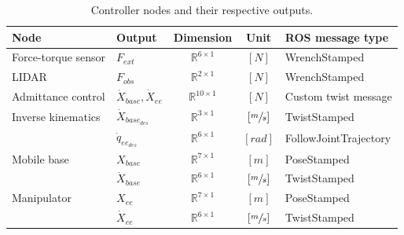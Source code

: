 \begin{table}[h]
\begin{center}
 \caption{Controller nodes and their respective outputs.}\vspace{1ex}
 \label{tab:controller_nodes}
 \begin{tabular}{l|lccl}
 \hline
Node & Output & Dimension & Unit & ROS message type \\ \hline \hline
Force-torque sensor & $F_{ext}$ & $\mathbb{R}^{6 \times 1}$ & $[N]$ & WrenchStamped \\
LIDAR & $F_{obs}$ & $\mathbb{R}^{2 \times 1}$ & $[N]$ & WrenchStamped \\
Admittance control & $\dot{X}_{base},\dot{X}_{ee}$ & $\mathbb{R}^{10 \times 1}$ & $[N]$ & Custom twist message \\
Inverse kinematics & $\dot{X}_{base_{des}}$ & $\mathbb{R}^{3 \times 1}$  & $[\sfrac{m}{s}]$ & TwistStamped \\
& $\dot{q}_{ee_{des}}$&$\mathbb{R}^{6 \times 1}$ & $[rad]$ & FollowJointTrajectory\\
Mobile base & $X_{base}$ & $\mathbb{R}^{7 \times 1}$ & $[m]$ & PoseStamped \\
& $\dot{X}_{base}$ & $\mathbb{R}^{6 \times 1}$ & $[\sfrac{m}{s}]$ & TwistStamped \\
Manipulator & $X_{ee}$ & $\mathbb{R}^{7 \times 1}$ & $[m]$ & PoseStamped \\
& $\dot{X}_{ee}$ & $\mathbb{R}^{6 \times 1}$ & $[\sfrac{m}{s}]$ & TwistStamped \\


 \hline
 \end{tabular}
\end{center}
\end{table}

